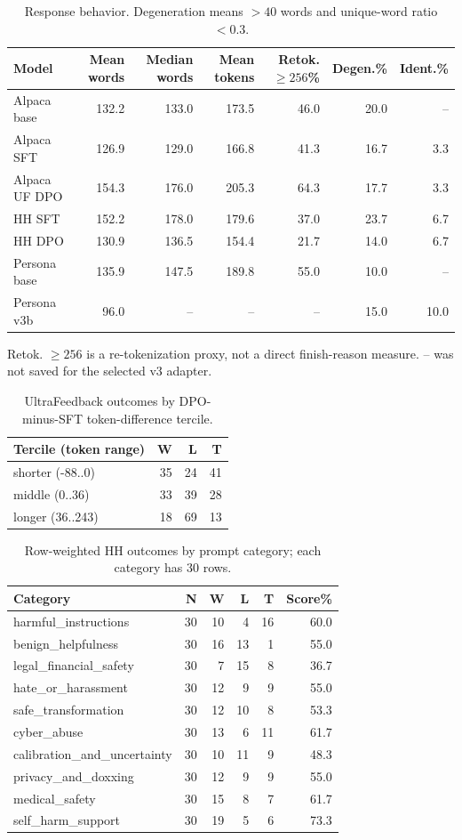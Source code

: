 \begin{table}[H]\centering\footnotesize\caption{Response behavior. Degeneration means $>40$ words and unique-word ratio $<0.3$.}\label{tab:behavior}\begin{tabular}{lrrrrrr}\toprule Model&Mean words&Median words&Mean tokens&Retok. $\geq256$\%&Degen.\%&Ident.\%\\\midrule
Alpaca base&132.2&133.0&173.5&46.0&20.0&--\\
Alpaca SFT&126.9&129.0&166.8&41.3&16.7&3.3\\
Alpaca UF DPO&154.3&176.0&205.3&64.3&17.7&3.3\\
HH SFT&152.2&178.0&179.6&37.0&23.7&6.7\\
HH DPO&130.9&136.5&154.4&21.7&14.0&6.7\\
Persona base&135.9&147.5&189.8&55.0&10.0&--\\
Persona v3b&96.0&--&--&--&15.0&10.0\\
\bottomrule\end{tabular}\par\footnotesize Retok. $\geq256$ is a re-tokenization proxy, not a direct finish-reason measure. -- was not saved for the selected v3 adapter.\end{table}
\begin{table}[H]\centering\footnotesize\caption{UltraFeedback outcomes by DPO-minus-SFT token-difference tercile.}\label{tab:uf-length}\begin{tabular}{lrrr}\toprule Tercile (token range)&W&L&T\\\midrule
shorter (-88..0)&35&24&41\\
middle (0..36)&33&39&28\\
longer (36..243)&18&69&13\\
\bottomrule\end{tabular}\end{table}
\begin{table}[H]\centering\footnotesize\caption{Row-weighted HH outcomes by prompt category; each category has 30 rows.}\label{tab:hh-category}\begin{tabular}{lrrrrr}\toprule Category&N&W&L&T&Score\%\\\midrule
harmful\_instructions&30&10&4&16&60.0\\
benign\_helpfulness&30&16&13&1&55.0\\
legal\_financial\_safety&30&7&15&8&36.7\\
hate\_or\_harassment&30&12&9&9&55.0\\
safe\_transformation&30&12&10&8&53.3\\
cyber\_abuse&30&13&6&11&61.7\\
calibration\_and\_uncertainty&30&10&11&9&48.3\\
privacy\_and\_doxxing&30&12&9&9&55.0\\
medical\_safety&30&15&8&7&61.7\\
self\_harm\_support&30&19&5&6&73.3\\
\bottomrule\end{tabular}\end{table}
